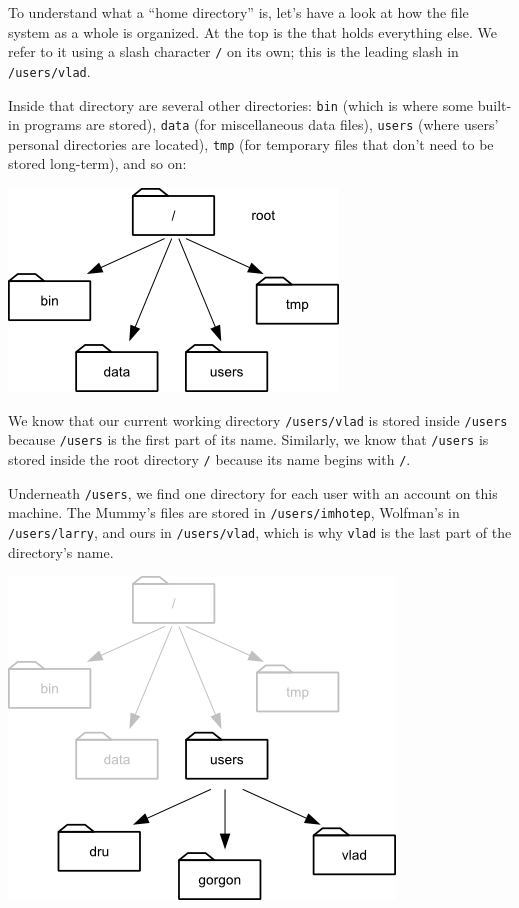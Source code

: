 \documentclass{book}
\begin{document}
To understand what a ``home directory'' is, let's have a look at how the
file system as a whole is organized. At the top is the
 that holds everything else.
We refer to it using a slash character \texttt{/} on its own; this is
the leading slash in \texttt{/users/vlad}.

Inside that directory are several other directories: \texttt{bin} (which
is where some built-in programs are stored), \texttt{data} (for
miscellaneous data files), \texttt{users} (where users' personal
directories are located), \texttt{tmp} (for temporary files that don't
need to be stored long-term), and so on:

\includegraphics{novice/shell/img/filesystem.png}

We know that our current working directory \texttt{/users/vlad} is
stored inside \texttt{/users} because \texttt{/users} is the first part
of its name. Similarly, we know that \texttt{/users} is stored inside
the root directory \texttt{/} because its name begins with \texttt{/}.

Underneath \texttt{/users}, we find one directory for each user with an
account on this machine. The Mummy's files are stored in
\texttt{/users/imhotep}, Wolfman's in \texttt{/users/larry}, and ours in
\texttt{/users/vlad}, which is why \texttt{vlad} is the last part of the
directory's name.

\includegraphics{novice/shell/img/home-directories.png}
\end{document}
